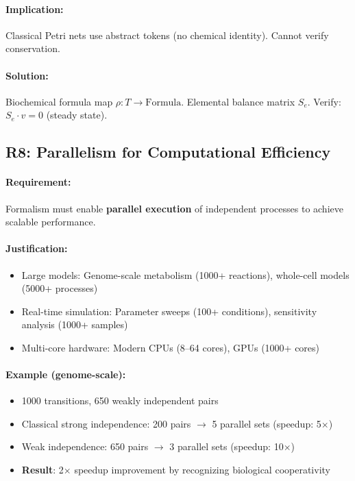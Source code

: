 \paragraph{Implication:} Classical Petri nets use abstract tokens (no chemical identity). Cannot verify conservation.

\paragraph{Solution:} Biochemical formula map $\rho: T \to \text{Formula}$. Elemental balance matrix $S_e$. Verify: $S_e \cdot v = 0$ (steady state).

\subsection{R8: Parallelism for Computational Efficiency}
\label{subsec:r8-parallelism}

\paragraph{Requirement:} Formalism must enable \textbf{parallel execution} of independent processes to achieve scalable performance.

\paragraph{Justification:}
\begin{itemize}
    \item Large models: Genome-scale metabolism (1000+ reactions), whole-cell models (5000+ processes)
    \item Real-time simulation: Parameter sweeps (100+ conditions), sensitivity analysis (1000+ samples)
    \item Multi-core hardware: Modern CPUs (8--64 cores), GPUs (1000+ cores)
\end{itemize}

\paragraph{Example (genome-scale):}
\begin{itemize}
    \item 1000 transitions, 650 weakly independent pairs
    \item Classical strong independence: 200 pairs $\to$ 5 parallel sets (speedup: 5$\times$)
    \item Weak independence: 650 pairs $\to$ 3 parallel sets (speedup: 10$\times$)
    \item \textbf{Result}: 2$\times$ speedup improvement by recognizing biological cooperativity
\end{itemize}

